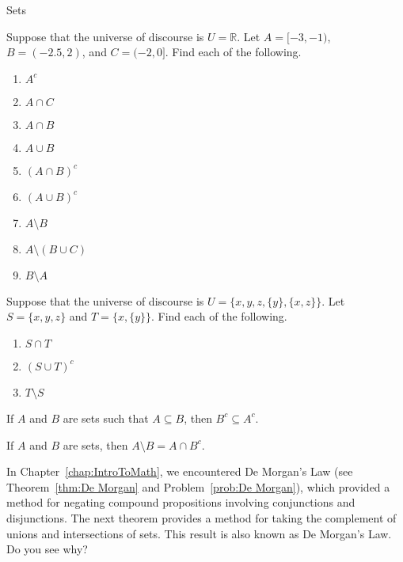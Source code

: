 \begin{section}{Sets}
\begin{problem}
Suppose that the universe of discourse is $U=\mathbb{R}$.  Let $A=[-3,-1)$, $B=(-2.5,2)$, and $C=(-2,0]$.  Find each of the following.
\begin{multicols}{2}
\begin{enumerate}[label=\textrm{(\alph*)}]
\item $A^c$
\item $A \cap C$
\item $A \cap B$
\item $A \cup B$
\item $(A\cap B)^c$
\item $(A\cup B)^c$
\item $A \setminus B$
\item $A\setminus (B \cup C)$
\item $B \setminus A$
\end{enumerate}
\end{multicols}
\end{problem}

\begin{problem}
Suppose that the universe of discourse is $U=\{x,y, z, \{y\}, \{x,z\}\}$. Let $S=\{x,y,z\}$ and $T=\{x,\{y\}\}$.  Find each of the following.  
\begin{enumerate}[label=\textrm{(\alph*)}]
\item $S \cap T$
\item $(S\cup T)^{c}$
\item $T\setminus S$
\end{enumerate}
\end{problem}

\begin{theorem}
If $A$ and $B$ are sets such that $A \subseteq B$, then $B^c \subseteq A^c$.
\end{theorem}

\begin{theorem}
If $A$ and $B$ are sets, then $A\setminus B = A \cap B^c$.
\end{theorem}


In Chapter~\ref{chap:IntroToMath}, we encountered De Morgan's Law (see Theorem~\ref{thm:De Morgan} and Problem~\ref{prob:De Morgan}), which provided a method for negating compound propositions involving conjunctions and disjunctions.  The next theorem provides a method for taking the complement of unions and intersections of sets.  This result is also known as De Morgan's Law. Do you see why?


\end{section}
